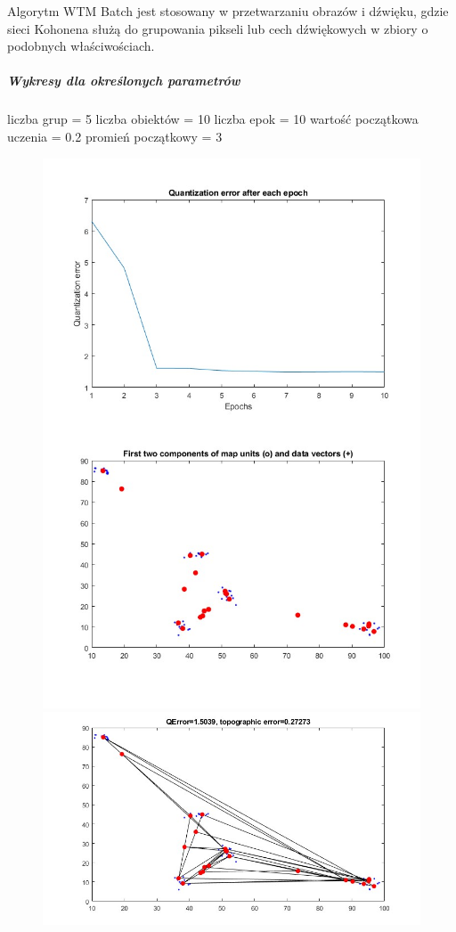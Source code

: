 \documentclass[11pt]{article}
\begin{document}
Algorytm WTM Batch jest stosowany w przetwarzaniu obrazów i dźwięku,
gdzie sieci Kohonena służą do grupowania pikseli lub cech dźwiękowych w
zbiory o podobnych właściwościach.

\hypertarget{wykresy-dla-okreux15blonych-parametruxf3w-2}{%
\subparagraph{Wykresy dla określonych
parametrów}\label{wykresy-dla-okreux15blonych-parametruxf3w-2}}

liczba grup = 5 liczba obiektów = 10 liczba epok = 10 wartość początkowa
uczenia = 0.2 promień początkowy = 3

\begin{figure}[h!]
  \includegraphics{screeny/WTM_batch/WTM_batch_5_groups/WTM_batch_learning_process.jpg}
  \includegraphics{screeny/WTM_batch/WTM_batch_5_groups/WTM_batch_Graph.jpg}

\end{figure}
\end{document}
